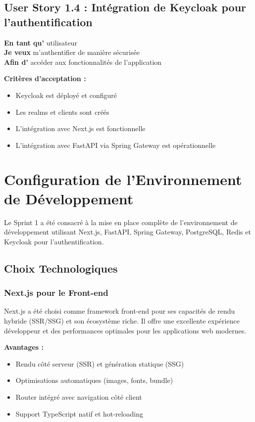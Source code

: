 \subsection{User Story 1.4 : Intégration de Keycloak pour l'authentification}

\textbf{En tant qu'} utilisateur \\
\textbf{Je veux} m'authentifier de manière sécurisée \\
\textbf{Afin d'} accéder aux fonctionnalités de l'application

\textbf{Critères d'acceptation :}
\begin{itemize}
    \item Keycloak est déployé et configuré
    \item Les realms et clients sont créés
    \item L'intégration avec Next.js est fonctionnelle
    \item L'intégration avec FastAPI via Spring Gateway est opérationnelle
\end{itemize}

\section{Configuration de l'Environnement de Développement}

Le Sprint 1 a été consacré à la mise en place complète de l'environnement de développement utilisant Next.js, FastAPI, Spring Gateway, PostgreSQL, Redis et Keycloak pour l'authentification.

\subsection{Choix Technologiques}

\subsubsection{Next.js pour le Front-end}

Next.js a été choisi comme framework front-end pour ses capacités de rendu hybride (SSR/SSG) et son écosystème riche. Il offre une excellente expérience développeur et des performances optimales pour les applications web modernes.

\textbf{Avantages :}
\begin{itemize}
    \item Rendu côté serveur (SSR) et génération statique (SSG)
    \item Optimisations automatiques (images, fonts, bundle)
    \item Router intégré avec navigation côté client
    \item Support TypeScript natif et hot-reloading
\end{itemize}

